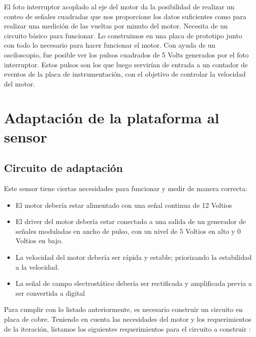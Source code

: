 El foto interruptor acoplado al eje del motor da la posibilidad de realizar un conteo de señales cuadradas que nos proporcione los datos suficientes como para realizar una medición de las vueltas por minuto del motor. Necesita de un circuito básico para funcionar. Lo construimos en una placa de prototipo junto con todo lo necesario para hacer funcionar el motor. Con ayuda de un osciloscopio, fue posible ver los pulsos cuadrados de 5 Volts generados por el foto interruptor. Estos pulsos son los que luego servirían de entrada a un contador de eventos de la placa de instrumentación, con el objetivo de controlar la velocidad del motor. \\


\section{Adaptación de la plataforma al sensor} %
\label{it6:sec:adaptacion_de_la_plataforma_al_sensor}

\subsection{Circuito de adaptación} %
\label{it6:sub:circuito_de_adaptacion}


Este sensor tiene ciertas necesidades para funcionar y medir de manera correcta:

\begin{itemize}
  \item El motor debería estar alimentado con una señal continua de 12 Voltios
  \item El driver del motor debería estar conectado a una salida de un generador de señales moduladas en ancho de pulso, con un nivel de 5 Voltios en alto y 0 Voltios en bajo.
  \item La velocidad del motor debería ser rápida y estable; priorizando la estabilidad a la velocidad.
  \item La señal de campo electrostático debería ser rectificada y amplificada previa a ser convertida a digital
\end{itemize}

Para cumplir con lo listado anteriormente, es necesario construir un circuito en placa de cobre. Teniendo en cuenta las necesidades del motor y los requerimientos de la iteración, listamos los siguientes requerimientos para el circuito a construir :

